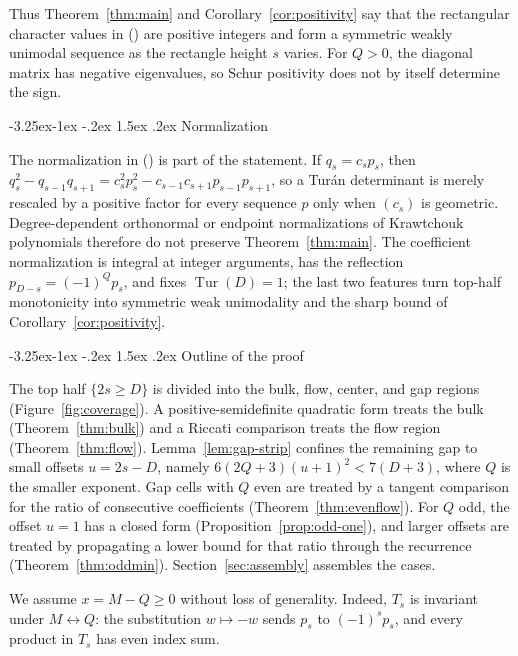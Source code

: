 \documentclass[twoside,10pt]{article}
\makeatletter
\numberwithin{equation}{section}
\theoremstyle{slbody}
\theoremstyle{definition}
\theoremstyle{remark}
\numberwithin{theorem}{section}
\DeclareMathOperator{\Tur}{Tur}
\renewcommand{\eqref}[1]{%
  \textup{{\normalfont(\oldstylenums{\ref{#1}}}\normalfont)}}
\renewcommand{\subsection}{%
  \@startsection{subsection}{2}{\z@}%
    {-3.25ex\@plus -1ex \@minus -.2ex}%
    {1.5ex \@plus .2ex}%
    {\normalfont\normalsize\bfseries}}
\makeatother
\begin{document}
Thus Theorem~\ref{thm:main} and Corollary~\ref{cor:positivity} say that
the rectangular character values in \eqref{eq:schur-character} are positive
integers and form a symmetric weakly unimodal sequence as the rectangle
height $s$ varies.  For $Q>0$, the diagonal matrix has negative eigenvalues,
so Schur positivity does not by itself determine the sign.

\subsection{Normalization}\label{subsec:normalization}

The normalization in \eqref{eq:pdef} is part of the statement.  If
$q_s=c_s p_s$, then
$q_s^2-q_{s-1}q_{s+1}=c_s^2p_s^2-c_{s-1}c_{s+1}p_{s-1}p_{s+1}$, so a
Tur\'an determinant is merely rescaled by a positive factor for every
sequence $p$ only when $(c_s)$ is geometric.  Degree-dependent orthonormal
or endpoint normalizations of Krawtchouk polynomials therefore do not
preserve Theorem~\ref{thm:main}.  The coefficient normalization is integral
at integer arguments, has the reflection $p_{D-s}=(-1)^Qp_s$, and
fixes $\Tur(D)=1$; the last two features turn top-half monotonicity into
symmetric weak unimodality and the sharp bound of
Corollary~\ref{cor:positivity}.

\subsection{Outline of the proof}\label{subsec:guide}

The top half $\{2s\ge D\}$ is divided into the bulk, flow, center, and gap
regions (Figure~\ref{fig:coverage}).  A positive-semidefinite quadratic form
treats the bulk (Theorem~\ref{thm:bulk}) and a Riccati comparison treats the
flow region (Theorem~\ref{thm:flow}).  Lemma~\ref{lem:gap-strip} confines
the remaining gap to small offsets $u=2s-D$, namely
$6(2Q+3)(u+1)^2<7(D+3)$, where $Q$ is the smaller exponent.  Gap cells with
$Q$ even are treated by a tangent comparison for the ratio of consecutive
coefficients (Theorem~\ref{thm:evenflow}).  For $Q$ odd, the offset $u=1$
has a closed form (Proposition~\ref{prop:odd-one}), and larger offsets are
treated by propagating a lower bound for that ratio through the recurrence
(Theorem~\ref{thm:oddmin}).  Section~\ref{sec:assembly} assembles the cases.

We assume $x=M-Q\ge 0$ without loss of generality.  Indeed, $T_s$ is
invariant under $M\leftrightarrow Q$: the substitution $w\mapsto-w$ sends
$p_s$ to $(-1)^sp_s$, and every product in $T_s$ has even index sum.
\end{document}
